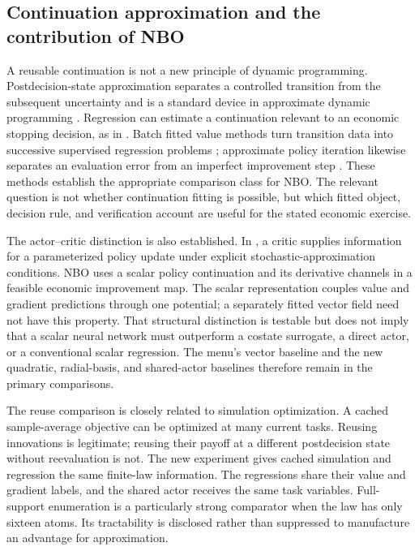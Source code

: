 \subsection{Continuation approximation and the contribution of NBO}
A reusable continuation is not a new principle of dynamic programming.
Postdecision-state approximation separates a controlled transition from the
subsequent uncertainty and is a standard device in approximate dynamic
programming \citep{powell2011}. Regression can estimate a continuation relevant
to an economic stopping decision, as in \citet{longstaff2001}. Batch fitted
value methods turn transition data into successive supervised regression
problems \citep{ernst2005}; approximate policy iteration likewise separates
an evaluation error from an imperfect improvement step
\citep{scherrer2015}. These methods establish the appropriate comparison
class for NBO. The relevant question is not whether continuation fitting is
possible, but which fitted object, decision rule, and verification account
are useful for the stated economic exercise.

The actor--critic distinction is also established. In
\citet{konda1999}, a critic supplies information for a parameterized policy
update under explicit stochastic-approximation conditions. NBO uses a scalar
policy continuation and its derivative channels in a feasible economic
improvement map. The scalar representation couples value and gradient
predictions through one potential; a separately fitted vector field need
not have this property. That structural distinction is testable but does
not imply that a scalar neural network must outperform a costate surrogate,
a direct actor, or a conventional scalar regression. The menu's vector
baseline and the new quadratic, radial-basis, and shared-actor baselines
therefore remain in the primary comparisons.

The reuse comparison is closely related to simulation optimization. A cached
sample-average objective can be optimized at many current tasks. Reusing
innovations is legitimate; reusing their payoff at a different postdecision
state without reevaluation is not. The new experiment gives cached simulation
and regression the same finite-law information. The regressions share their
value and gradient labels, and the shared actor receives the same task
variables. Full-support enumeration is a particularly strong comparator
when the law has only sixteen atoms. Its tractability is disclosed rather
than suppressed to manufacture an advantage for approximation.


